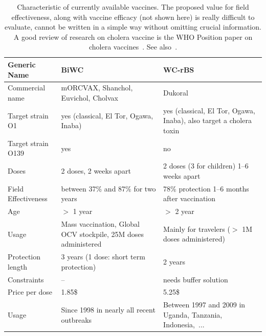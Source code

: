 \begin{table}[h]
\centering\small
\label{tab:prior}
\begin{tabular}{lp{50mm}p{50mm}}
\toprule
Generic Name &  BiWC & WC-rBS\\ 
\midrule
Commercial name   &  mORCVAX, Shanchol,  Euvichol, Cholvax & Dukoral  \\
Target strain O1 &   yes (classical, El Tor, Ogawa, Inaba)& yes (classical, El Tor, Ogawa, Inaba), also  target a cholera toxin  \\
Target strain O139   &  yes &      no     \\
Doses   &  2 doses, 2 weeks apart & 2 doses (3 for children) 1--6 weeks apart  \\
Field Effectiveness  & between 37\% and 87\% for two years & 78\% protection 1--6 months after vaccination\\
Age   &  $>$ 1 year & $>$ 2 year      \\
Usage & Mass vaccination, Global OCV stockpile, 25M doses administered & Mainly for travelers ($>$ 1M doses administered)\\
Protection length & 3 years (1 dose: short term protection) & 2 years\\
Constraints & -- & needs buffer solution\\
Price per dose & 1.85\$ & 5.25\$ \\ 
Usage & Since 1998 in nearly all recent outbreaks & Between 1997 and 2009 in Uganda, Tanzania, Indonesia,~... \\
\bottomrule
\end{tabular}
\caption{Characteristic of currently available vaccines. The proposed value for field effectiveness, along with vaccine efficacy (not shown here) is really difficult to evaluate, cannot be written in a simple way without omitting crucial information. A good review of research on cholera vaccine is the WHO Position paper on cholera vaccines~. See also~\parencite{WHO:BackgroundPaperIntegration:2009,Luquero:UseVibrioCholerae:2014,Qadri:EfficacySingledoseRegimen:2018,Bi:ProtectionCholeraKilled:2017,Azman:ImpactOneDoseTwoDose:2015,Tohme:OralCholeraVaccine:2015}.}
\label{tab:vacc}
\end{table}

